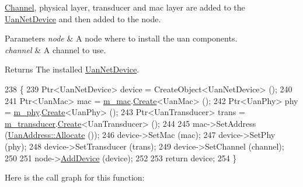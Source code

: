 \hyperlink{classns3_1_1Channel}{Channel}, physical layer, transducer and mac layer are added to the \hyperlink{classns3_1_1UanNetDevice}{Uan\+Net\+Device} and then added to the node.


\begin{DoxyParams}{Parameters}
{\em node} & A node where to install the uan components. \\
\hline
{\em channel} & A channel to use. \\
\hline
\end{DoxyParams}
\begin{DoxyReturn}{Returns}
The installed \hyperlink{classns3_1_1UanNetDevice}{Uan\+Net\+Device}. 
\end{DoxyReturn}

\begin{DoxyCode}
238 \{
239   Ptr<UanNetDevice> device = CreateObject<UanNetDevice> ();
240 
241   Ptr<UanMac> mac = \hyperlink{classns3_1_1UanHelper_a6556792e4c972424dd41d1d800880cc8}{m\_mac}.\hyperlink{classns3_1_1ObjectFactory_a18152e93f0a6fe184ed7300cb31e9896}{Create}<UanMac> ();
242   Ptr<UanPhy> phy = \hyperlink{classns3_1_1UanHelper_a30140863225d35593e083ffdbdad4aae}{m\_phy}.\hyperlink{classns3_1_1ObjectFactory_a18152e93f0a6fe184ed7300cb31e9896}{Create}<UanPhy> ();
243   Ptr<UanTransducer> trans = \hyperlink{classns3_1_1UanHelper_a3c3c7bacb7a21e76746c3aa96a9b67f6}{m\_transducer}.\hyperlink{classns3_1_1ObjectFactory_a18152e93f0a6fe184ed7300cb31e9896}{Create}<UanTransducer> ();
244 
245   mac->SetAddress (\hyperlink{classns3_1_1UanAddress_ad288f3dfb464eea5b2b76828f3a1d8f0}{UanAddress::Allocate} ());
246   device->SetMac (mac);
247   device->SetPhy (phy);
248   device->SetTransducer (trans);
249   device->SetChannel (channel);
250 
251   node->\hyperlink{classns3_1_1Node_a42ff83ee1d5d1649c770d3f5b62375de}{AddDevice} (device);
252 
253   \textcolor{keywordflow}{return} device;
254 \}
\end{DoxyCode}


Here is the call graph for this function\+:


